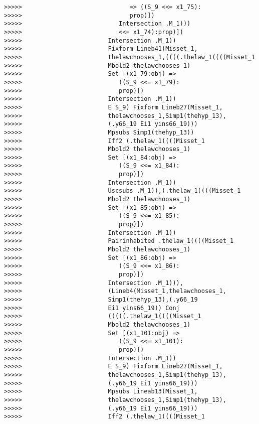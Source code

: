 \documentclass[12pt]{article}
\begin{document}
\begin{verbatim}
>>>>>                              => ((S_9 <<= x1_75):
>>>>>                              prop)])
>>>>>                           Intersection .M_1)))
>>>>>                           <<= x1_74):prop)])
>>>>>                        Intersection .M_1))
>>>>>                        Fixform Lineb41(Misset_1,
>>>>>                        thelawchooses_1,((((.thelaw_1((((Misset_1
>>>>>                        Mbold2 thelawchooses_1)
>>>>>                        Set [(x1_79:obj) =>
>>>>>                           ((S_9 <<= x1_79):
>>>>>                           prop)])
>>>>>                        Intersection .M_1))
>>>>>                        E S_9) Fixform Lineb27(Misset_1,
>>>>>                        thelawchooses_1,Simp1(thehyp_13),
>>>>>                        (.y66_19 Ei1 yins66_19)))
>>>>>                        Mpsubs Simp1(thehyp_13))
>>>>>                        Iff2 (.thelaw_1((((Misset_1
>>>>>                        Mbold2 thelawchooses_1)
>>>>>                        Set [(x1_84:obj) =>
>>>>>                           ((S_9 <<= x1_84):
>>>>>                           prop)])
>>>>>                        Intersection .M_1))
>>>>>                        Uscsubs .M_1)),(.thelaw_1((((Misset_1
>>>>>                        Mbold2 thelawchooses_1)
>>>>>                        Set [(x1_85:obj) =>
>>>>>                           ((S_9 <<= x1_85):
>>>>>                           prop)])
>>>>>                        Intersection .M_1))
>>>>>                        Pairinhabited .thelaw_1((((Misset_1
>>>>>                        Mbold2 thelawchooses_1)
>>>>>                        Set [(x1_86:obj) =>
>>>>>                           ((S_9 <<= x1_86):
>>>>>                           prop)])
>>>>>                        Intersection .M_1))),
>>>>>                        (Lineb4(Misset_1,thelawchooses_1,
>>>>>                        Simp1(thehyp_13),(.y66_19
>>>>>                        Ei1 yins66_19)) Conj
>>>>>                        (((((.thelaw_1((((Misset_1
>>>>>                        Mbold2 thelawchooses_1)
>>>>>                        Set [(x1_101:obj) =>
>>>>>                           ((S_9 <<= x1_101):
>>>>>                           prop)])
>>>>>                        Intersection .M_1))
>>>>>                        E S_9) Fixform Lineb27(Misset_1,
>>>>>                        thelawchooses_1,Simp1(thehyp_13),
>>>>>                        (.y66_19 Ei1 yins66_19)))
>>>>>                        Mpsubs Lineab13(Misset_1,
>>>>>                        thelawchooses_1,Simp1(thehyp_13),
>>>>>                        (.y66_19 Ei1 yins66_19)))
>>>>>                        Iff2 (.thelaw_1((((Misset_1

\end{verbatim}
\end{document}
